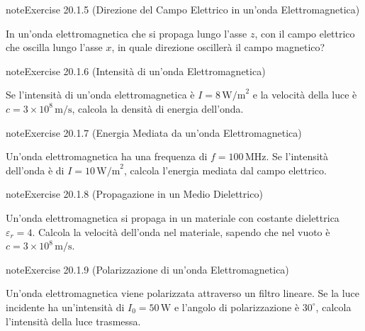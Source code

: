 \documentclass[letterpaper,10pt,italian]{jupyterBook}
\begin{document}
\begin{sphinxadmonition}{note}{Exercise 20.1.5 (Direzione del Campo Elettrico in un’onda Elettromagnetica)}



\sphinxAtStartPar
In un’onda elettromagnetica che si propaga lungo l’asse \(z\), con il campo elettrico che oscilla lungo l’asse \(x\), in quale direzione oscillerà il campo magnetico?
\end{sphinxadmonition}
 \label{exercise:ch/electromagnetism/em-waves-problems-exercise-5}

\begin{sphinxadmonition}{note}{Exercise 20.1.6 (Intensità di un’onda Elettromagnetica)}



\sphinxAtStartPar
Se l’intensità di un’onda elettromagnetica è \(I = 8 \, \text{W/m}^2\) e la velocità della luce è \(c = 3 \times 10^8 \, \text{m/s}\), calcola la densità di energia dell’onda.
\end{sphinxadmonition}
 \label{exercise:ch/electromagnetism/em-waves-problems-exercise-6}

\begin{sphinxadmonition}{note}{Exercise 20.1.7 (Energia Mediata da un’onda Elettromagnetica)}



\sphinxAtStartPar
Un’onda elettromagnetica ha una frequenza di \(f = 100 \, \text{MHz}\). Se l’intensità dell’onda è di \(I = 10 \, \text{W/m}^2\), calcola l’energia mediata dal campo elettrico.
\end{sphinxadmonition}
 \label{exercise:ch/electromagnetism/em-waves-problems-exercise-7}

\begin{sphinxadmonition}{note}{Exercise 20.1.8 (Propagazione in un Medio Dielettrico)}



\sphinxAtStartPar
Un’onda elettromagnetica si propaga in un materiale con costante dielettrica \(\varepsilon_r = 4\). Calcola la velocità dell’onda nel materiale, sapendo che nel vuoto è \(c = 3 \times 10^8 \, \text{m/s}\).
\end{sphinxadmonition}
 \label{exercise:ch/electromagnetism/em-waves-problems-exercise-8}

\begin{sphinxadmonition}{note}{Exercise 20.1.9 (Polarizzazione di un’onda Elettromagnetica)}



\sphinxAtStartPar
Un’onda elettromagnetica viene polarizzata attraverso un filtro lineare. Se la luce incidente ha un’intensità di \(I_0 = 50 \, \text{W}\) e l’angolo di polarizzazione è \(30^\circ\), calcola l’intensità della luce trasmessa.
\end{sphinxadmonition}
 \label{exercise:ch/electromagnetism/em-waves-problems-exercise-9}
\end{document}
